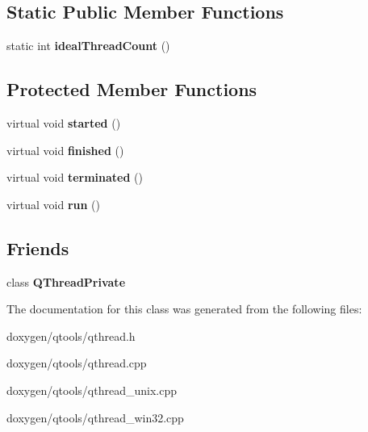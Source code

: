 \subsection*{Static Public Member Functions}
\begin{DoxyCompactItemize}
\item 
\mbox{\label{class_q_thread_aaf77d52b4551aed2847b1c8628ee8143}} 
static int {\bfseries ideal\+Thread\+Count} ()
\end{DoxyCompactItemize}
\subsection*{Protected Member Functions}
\begin{DoxyCompactItemize}
\item 
\mbox{\label{class_q_thread_a4340e01c4d6c199992b9673f1ceaf32d}} 
virtual void {\bfseries started} ()
\item 
\mbox{\label{class_q_thread_a931f07f4481c6afa801c59a60342cf4b}} 
virtual void {\bfseries finished} ()
\item 
\mbox{\label{class_q_thread_acd3daf2d2a2cd5370e77358eda5fa63d}} 
virtual void {\bfseries terminated} ()
\item 
\mbox{\label{class_q_thread_ad0134105f952c8d1d1d758f631a5852c}} 
virtual void {\bfseries run} ()
\end{DoxyCompactItemize}
\subsection*{Friends}
\begin{DoxyCompactItemize}
\item 
\mbox{\label{class_q_thread_a2e612ca58844e5eaa40195970aa02cf5}} 
class {\bfseries Q\+Thread\+Private}
\end{DoxyCompactItemize}


The documentation for this class was generated from the following files\+:\begin{DoxyCompactItemize}
\item 
doxygen/qtools/qthread.\+h\item 
doxygen/qtools/qthread.\+cpp\item 
doxygen/qtools/qthread\+\_\+unix.\+cpp\item 
doxygen/qtools/qthread\+\_\+win32.\+cpp\end{DoxyCompactItemize}
